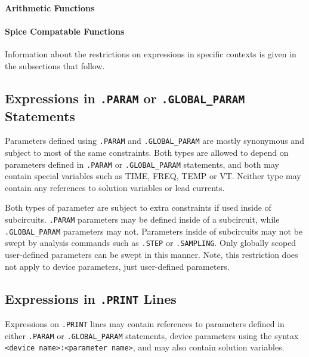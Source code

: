 \paragraph{Arithmetic Functions}


\paragraph{Spice Compatable Functions}


Information about the restrictions on expressions in specific contexts
is given in the subsections that follow.

\subsection{Expressions in \texttt{.PARAM} or \texttt{.GLOBAL\_PARAM} Statements}

Parameters defined using \texttt{.PARAM} and \texttt{.GLOBAL\_PARAM} are 
mostly synonymous and subject to most of the same constraints.
Both types are 
allowed to depend on parameters defined in \texttt{.PARAM} or
\texttt{.GLOBAL\_PARAM} statements, and both may contain special variables
such as \textrm{TIME}, \textrm{FREQ}, \textrm{TEMP} or \textrm{VT}.  Neither type
may contain any references to solution variables or lead currents.



Both types of parameter are subject to extra constraints if used inside of subcircuits.  
\texttt{.PARAM} parameters may be defined inside of a subcircuit, while \texttt{.GLOBAL\_PARAM} 
parameters may not.  Parameters inside of subcircuits may not be swept by 
analysis commands such as \texttt{.STEP} or \texttt{.SAMPLING}.  Only globally 
scoped user-defined parameters can be swept in this manner.  Note, this restriction 
does not apply to device parameters, just user-defined parameters.

\subsection{Expressions in \texttt{.PRINT} Lines}

Expressions on \texttt{.PRINT} lines may contain references to
parameters defined in either \texttt{.PARAM} or
\texttt{.GLOBAL\_PARAM} statements, device parameters using the syntax
\texttt{<device name>:<parameter name>}, and may also contain solution
variables.

